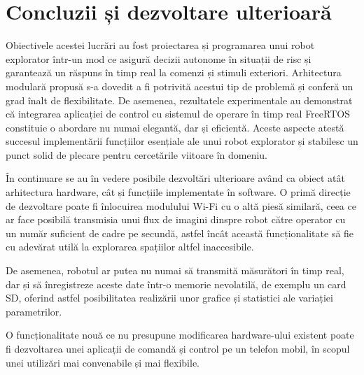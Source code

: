 \chapter{Concluzii și dezvoltare ulterioară}

Obiectivele acestei lucrări au fost proiectarea și programarea unui robot \mbox{explorator} într-un mod ce asigură decizii autonome în situații de risc și \mbox{garantează} un răspuns în timp real la comenzi și stimuli exteriori. Arhitectura modulară \mbox{propusă} s-a dovedit a fi potrivită acestui tip de problemă și conferă un grad înalt de flexibilitate. De asemenea, rezultatele experimentale au demonstrat că \mbox{integrarea} aplicației de control cu sistemul de operare în timp real FreeRTOS constituie o abordare nu numai elegantă, dar și eficientă. Aceste aspecte atestă succesul implementării funcțiilor esențiale ale unui robot explorator și stabilesc un punct solid de plecare pentru cercetările viitoare în domeniu. 

În continuare se au în vedere posibile dezvoltări ulterioare având ca obiect atât arhitectura hardware, cât și funcțiile implementate în software. O primă direcție de dezvoltare poate fi înlocuirea modulului Wi-Fi cu o altă piesă similară, ceea ce ar face posibilă transmisia unui flux de imagini dinspre robot către operator cu un număr suficient de cadre pe secundă, astfel încât această funcționalitate să fie cu adevărat utilă la explorarea spațiilor altfel inaccesibile.

De asemenea, robotul ar putea nu numai să transmită măsurători în timp real, dar și să înregistreze aceste date într-o memorie nevolatilă, de exemplu un card SD, oferind astfel posibilitatea realizării unor grafice și statistici ale variației parametrilor.

O funcționalitate nouă ce nu presupune modificarea hardware-ului existent poate fi dezvoltarea unei aplicații de comandă și control pe un telefon mobil, în scopul unei utilizări mai convenabile și mai flexibile.